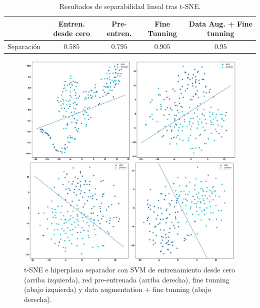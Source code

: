 \documentclass[11pt]{article}
\begin{document}
\begin{enumerate}
    \begin{table}[H]
        \centering
        \begin{tabular}{c|cccc}
                        & \textbf{Entren. desde cero} & \textbf{Pre-entren.} & \textbf{Fine Tunning} & \textbf{Data Aug. + Fine tunning} \\ \hline
            Separación & \( 0.585 \)  & \( 0.795 \)  & \( 0.905 \)  &  \( 0.95 \)         \\
        \end{tabular}
        \caption{Resultados de separabilidad lineal tras t-SNE.}\label{tab:svm}
    \end{table}

    \begin{figure}
        \centering
        \includegraphics[scale = 0.3]{imgs/tsne.png}
        \caption{t-SNE e hiperplano separador con SVM de entrenamiento desde cero (arriba izquierda), red pre-entrenada (arriba derecha), fine tunning (abajo izquierda) y data augmentation + fine tunning (abajo derecha).}\label{fig:tsne}
    \end{figure}

    \end{enumerate}
\end{document}
